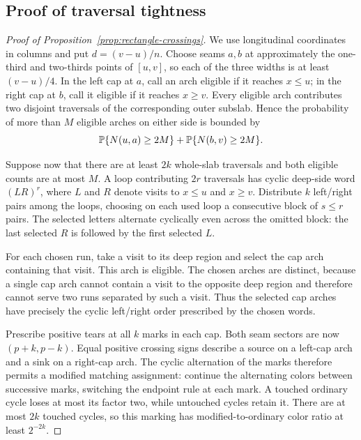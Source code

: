 \subsection{Proof of traversal tightness}

\begin{proof}[Proof of Proposition~\ref{prop:rectangle-crossings}]
We use longitudinal coordinates in columns and put
$d=(v-u)/n$.  Choose seams $a,b$ at approximately the one-third and
two-thirds points of $[u,v]$, so each of the three widths is at least
$(v-u)/4$.  In the left cap at $a$, call an arch eligible if it reaches
$x\le u$; in the right cap at $b$, call it eligible if it reaches
$x\ge v$.  Every eligible arch contributes two disjoint traversals of
the corresponding outer subslab.  Hence the probability of more than
$M$ eligible arches on either side is bounded by
\begin{equation}\label{eq:eligible-exception}
 \mathbb P\{N(u,a)\ge2M\}+\mathbb P\{N(b,v)\ge2M\}.
\end{equation}

Suppose now that there are at least $2k$ whole-slab traversals and both
eligible counts are at most $M$.  A loop contributing $2r$ traversals
has cyclic deep-side word $(LR)^r$, where $L$ and $R$ denote visits to
$x\le u$ and $x\ge v$.  Distribute $k$ left/right pairs among the loops,
choosing on each used loop a consecutive block of $s\le r$ pairs.
The selected letters alternate cyclically even across the omitted block:
the last selected $R$ is followed by the first selected $L$.

For each chosen run, take a visit to its deep region and select the
cap arch containing that visit.  This arch is eligible.  The chosen
arches are distinct, because a single cap arch cannot contain a visit
to the opposite deep region and therefore cannot serve two runs
separated by such a visit.  Thus the selected cap arches have precisely
the cyclic left/right order prescribed by the chosen words.

Prescribe positive tears at all $k$ marks in each cap.  Both seam sectors
are now $(p+k,p-k)$.  Equal positive crossing signs describe a source
on a left-cap arch and a sink on a right-cap arch.  The cyclic alternation
of the marks therefore permits a modified matching assignment: continue
the alternating colors between successive marks, switching the endpoint
rule at each mark.  A touched ordinary cycle loses at most its factor
two, while untouched cycles retain it.  There are at most $2k$ touched
cycles, so this marking has modified-to-ordinary color ratio at least
$2^{-2k}$.


\end{proof}
